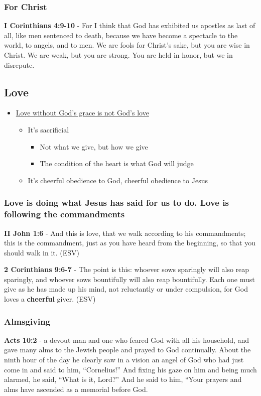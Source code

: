 \documentclass[11pt]{article}
\begin{document}
\subsubsection{For Christ}
\label{sec:org2e6d038}
\textbf{I Corinthians 4:9-10} - For I think that God has exhibited us apostles as last of all, like men sentenced to death, because we have become a spectacle to the world, to angels, and to men. We are fools for Christ's sake, but you are wise in Christ. We are weak, but you are strong. You are held in honor, but we in disrepute.

\subsection{Love}
\label{sec:orgfd54bee}
\begin{itemize}
\item \href{https://www.youtube.com/watch?v=d2FKSxaa76w\&ab\_channel=FatherSpyridon}{Love without God's grace is not God's love}
\begin{itemize}
\item It's sacrificial
\begin{itemize}
\item Not what we give, but how we give
\item The condition of the heart is what God will judge
\end{itemize}
\item It's cheerful obedience to God, cheerful obedience to Jesus
\end{itemize}
\end{itemize}

\subsubsection{Love is doing what Jesus has said for us to do. Love is following the commandments}
\label{sec:org6f31e3a}
\textbf{II John 1:6} - And this is love, that we walk according to his commandments; this is the commandment, just as you have heard from the beginning, so that you should walk in it. (ESV)

\textbf{2 Corinthians 9:6-7} - The point is this: whoever sows sparingly will also reap sparingly, and whoever sows bountifully will also reap bountifully.  Each one must give as he has made up his mind, not reluctantly or under compulsion, for God loves a \textbf{cheerful} giver.  (ESV)

\subsubsection{Almsgiving}
\label{sec:orgd12d6c0}
\textbf{Acts 10:2} - a devout man and one who feared God with all his household, and gave many alms to the Jewish people and prayed to God continually.  About the ninth hour of the day he clearly saw in a vision an angel of God who had just come in and said to him, “Cornelius!” And fixing his gaze on him and being much alarmed, he said, “What is it, Lord?” And he said to him, “Your prayers and alms have ascended as a memorial before God.
\end{document}
